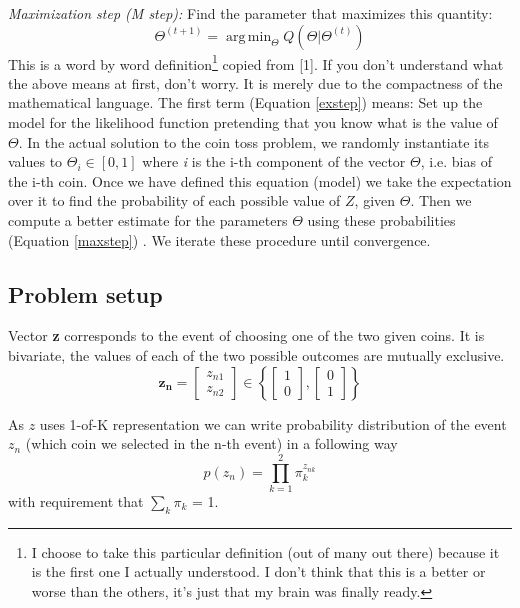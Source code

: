 \documentclass[11pt]{article}
\DeclareMathOperator*{\argminA}{arg\,min}
\begin{document}
\textit{Maximization step (M step):} Find the parameter that maximizes this quantity:
\begin{equation}\label{maxstep}
\Theta^{(t+1)}=\argminA_\Theta Q(\Theta|\Theta^{(t)})
\end{equation}
This is a word by word definition\footnote{I choose to take this particular definition (out of many out there) because it is the first one I actually understood. I don't think that this is a better or worse than the others, it's just that my brain was finally ready.} copied from [1].
If you don't understand what the above means at first, don't worry. It is merely due to the compactness of the mathematical language. The first term (Equation \eqref{exstep}) means: Set up the model for the likelihood function pretending that you know what is the value of $\Theta$. In the actual solution to the coin toss problem, we randomly instantiate its values to $\Theta_i \in [0,1]$ where \textit{i} is the i-th component of the vector $\Theta$, i.e. bias of the i-th coin. Once we have defined this equation (model) we take the expectation over it to find the probability of each possible value of $Z$, given $\Theta$. Then we compute a better estimate for the parameters $\Theta$ using these probabilities (Equation \eqref{maxstep}) . We iterate these procedure until convergence.
\subsection{Problem setup}\label{section:mathmode}
Vector \textbf{z} corresponds to the event of choosing one of the two given coins. It is bivariate, the values of each of the two possible outcomes are mutually exclusive.
\begin{equation}
\bm{z_{n}} = \begin{bmatrix}
z_{n1} \\
z_{n2}
\end{bmatrix}
\in \left \{
\begin{bmatrix}
{1} \\
{0}
\end{bmatrix},
\begin{bmatrix}
{0} \\
{1}
\end{bmatrix}
\right \}
\end{equation}

As $z$ uses 1-of-K representation we can write probability distribution of the event $z_n$ (which coin we selected in the n-th event) in a following way
\begin{equation}\label{oneofk}
p(z_{n}) = \prod_{k=1}^{2} \pi_{k}^{z_{nk}}
\end{equation}
with requirement that $\sum_{k}\pi_{k}$ = 1.
\end{document}
